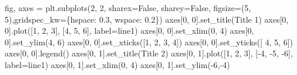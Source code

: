 \documentclass[
  letterpaper,
  DIV=11,
  numbers=noendperiod]{scrreprt}
\newenvironment{Shaded}{\begin{snugshade}}{\end{snugshade}}
\newcommand{\DecValTok}[1]{\textcolor[rgb]{0.68,0.00,0.00}{#1}}
\newcommand{\FloatTok}[1]{\textcolor[rgb]{0.68,0.00,0.00}{#1}}
\newcommand{\NormalTok}[1]{\textcolor[rgb]{0.00,0.23,0.31}{#1}}
\newcommand{\OperatorTok}[1]{\textcolor[rgb]{0.37,0.37,0.37}{#1}}
\newcommand{\StringTok}[1]{\textcolor[rgb]{0.13,0.47,0.30}{#1}}
\newcommand{\VariableTok}[1]{\textcolor[rgb]{0.07,0.07,0.07}{#1}}
\begin{document}
\begin{Shaded}
\begin{Highlighting}[]
\NormalTok{fig, axes }\OperatorTok{=}\NormalTok{ plt.subplots(}\DecValTok{2}\NormalTok{, }\DecValTok{2}\NormalTok{, sharex}\OperatorTok{=}\VariableTok{False}\NormalTok{, sharey}\OperatorTok{=}\VariableTok{False}\NormalTok{, figsize}\OperatorTok{=}\NormalTok{(}\DecValTok{5}\NormalTok{, }\DecValTok{5}\NormalTok{),gridspec\_kw}\OperatorTok{=}\NormalTok{\{}\StringTok{\textquotesingle{}hspace\textquotesingle{}}\NormalTok{: }\FloatTok{0.3}\NormalTok{, }\StringTok{\textquotesingle{}wspace\textquotesingle{}}\NormalTok{: }\FloatTok{0.2}\NormalTok{\})}
\NormalTok{axes[}\DecValTok{0}\NormalTok{, }\DecValTok{0}\NormalTok{].set\_title(}\StringTok{\textquotesingle{}Title 1\textquotesingle{}}\NormalTok{)}
\NormalTok{axes[}\DecValTok{0}\NormalTok{, }\DecValTok{0}\NormalTok{].plot([}\DecValTok{1}\NormalTok{, }\DecValTok{2}\NormalTok{, }\DecValTok{3}\NormalTok{], [}\DecValTok{4}\NormalTok{, }\DecValTok{5}\NormalTok{, }\DecValTok{6}\NormalTok{], label}\OperatorTok{=}\StringTok{\textquotesingle{}line1\textquotesingle{}}\NormalTok{)}
\NormalTok{axes[}\DecValTok{0}\NormalTok{, }\DecValTok{0}\NormalTok{].set\_xlim(}\DecValTok{0}\NormalTok{, }\DecValTok{4}\NormalTok{)}
\NormalTok{axes[}\DecValTok{0}\NormalTok{, }\DecValTok{0}\NormalTok{].set\_ylim(}\DecValTok{4}\NormalTok{, }\DecValTok{6}\NormalTok{)}
\NormalTok{axes[}\DecValTok{0}\NormalTok{, }\DecValTok{0}\NormalTok{].set\_xticks([}\DecValTok{1}\NormalTok{, }\DecValTok{2}\NormalTok{, }\DecValTok{3}\NormalTok{, }\DecValTok{4}\NormalTok{])}
\NormalTok{axes[}\DecValTok{0}\NormalTok{, }\DecValTok{0}\NormalTok{].set\_yticks([ }\DecValTok{4}\NormalTok{, }\DecValTok{5}\NormalTok{, }\DecValTok{6}\NormalTok{])}
\NormalTok{axes[}\DecValTok{0}\NormalTok{, }\DecValTok{0}\NormalTok{].legend()}
\NormalTok{axes[}\DecValTok{0}\NormalTok{, }\DecValTok{1}\NormalTok{].set\_title(}\StringTok{\textquotesingle{}Title 2\textquotesingle{}}\NormalTok{)}
\NormalTok{axes[}\DecValTok{0}\NormalTok{, }\DecValTok{1}\NormalTok{].plot([}\DecValTok{1}\NormalTok{, }\DecValTok{2}\NormalTok{, }\DecValTok{3}\NormalTok{], [}\OperatorTok{{-}}\DecValTok{4}\NormalTok{, }\OperatorTok{{-}}\DecValTok{5}\NormalTok{, }\OperatorTok{{-}}\DecValTok{6}\NormalTok{], label}\OperatorTok{=}\StringTok{\textquotesingle{}line1\textquotesingle{}}\NormalTok{)}
\NormalTok{axes[}\DecValTok{0}\NormalTok{, }\DecValTok{1}\NormalTok{].set\_xlim(}\DecValTok{0}\NormalTok{, }\DecValTok{4}\NormalTok{)}
\NormalTok{axes[}\DecValTok{0}\NormalTok{, }\DecValTok{1}\NormalTok{].set\_ylim(}\OperatorTok{{-}}\DecValTok{6}\NormalTok{,}\OperatorTok{{-}}\DecValTok{4}\NormalTok{)}

\end{Highlighting}
\end{Shaded}
\end{document}
